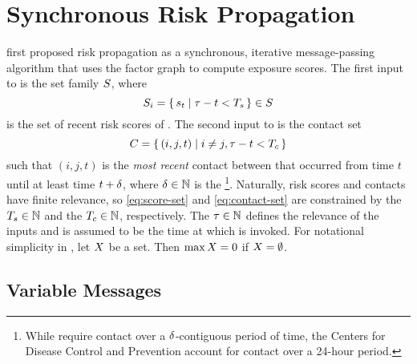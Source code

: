 \section{Synchronous Risk Propagation}\label{sec:synchronous}

\newcommand{\pDiff}{\epsilon}
\newcommand{\topK}[1]{\text{top } K \text{ of } #1}
\newcommand{\vRiskScores}[2]{\vSet{R}_{#1}^{(#2)}}
\newcommand{\vExposureScore}[2]{r_{#1}^{(#2)}}
\newcommand{\vExposureScores}[1]{\mathbf{r}^{(#1)}}
\newcommand{\dist}{d}

\citet{Ayday2021} first proposed risk propagation as a synchronous, iterative message-passing algorithm that uses the factor graph to compute exposure scores. The first input to \cRiskPropagation{} is the set family $S$, where
%
\begin{equation} \label{eq:score-set}
  S_i =\set{ s_t | \tau- t < T_s} \in S
\end{equation}
%
is the set of recent risk scores of . The second input to \cRiskPropagation{} is the contact set
%
\begin{equation} \label{eq:contact-set}
  C = \set{ (i, j, t) | i \neq j, \tau- t < T_c}
\end{equation}
%
such that $(i, j, t)$ is the \emph{most recent} contact between  that occurred from time $t$ until at least time $t + \delta$, where $\delta \in \mathbb{N}$ is the \footnote{While \citet{Ayday2021} require contact over a $\delta$-contiguous period of time, the Centers for Disease Control and Prevention \citeyearpar{CDC2021} account for contact over a 24-hour period.}. Naturally, risk scores and contacts have finite relevance, so \eqref{eq:score-set} and \eqref{eq:contact-set} are constrained by the  $T_s \in \mathbb{N}$ and the  $T_c \in \mathbb{N}$, respectively. The  $\tau \in \mathbb{N}$ defines the relevance of the inputs and is assumed to be the time at which \cRiskPropagation{} is invoked. For notational simplicity in \cRiskPropagation{}, let $X$ be a set. Then $\max X = 0$ if $X = \emptyset$.

\subsection{Variable Messages}

